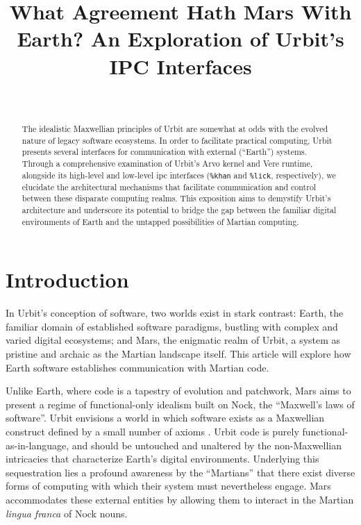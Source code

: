 \documentclass[twoside]{article}
\title{What Agreement Hath Mars With Earth?  An Exploration of Urbit's IPC Interfaces}
\author{~\authorpatp \\ \affiliation}
\date{}
\begin{document}
\maketitle
\thispagestyle{firststyle}

\begin{abstract}
\noindent \sloppy
The idealistic Maxwellian principles of Urbit are somewhat at odds with the evolved nature of legacy software ecosystems.  In order to facilitate practical computing, Urbit presents several interfaces for communication with external (“Earth”) systems.  Through a comprehensive examination of Urbit's Arvo kernel and Vere runtime, alongside its high-level and low-level {\sc ipc} interfaces (\texttt{\%khan} and \texttt{\%lick}, respectively), we elucidate the architectural mechanisms that facilitate communication and control between these disparate computing realms.  This exposition aims to demystify Urbit's architecture and underscore its potential to bridge the gap between the familiar digital environments of Earth and the untapped possibilities of Martian computing.
\end{abstract}

\setcounter{page}{1}

\tableofcontents

\section{Introduction}

In Urbit's conception of software, two worlds exist in stark contrast:  Earth, the familiar domain of established software paradigms, bustling with complex and varied digital ecosystems; 
and Mars, the enigmatic realm of Urbit, a system as pristine and archaic as the Martian landscape itself.  This article will explore how Earth software establishes communication with Martian code.

\sloppy
Unlike Earth, where code is a tapestry of evolution and patchwork, Mars aims to present a regime of functional-only idealism built on Nock, the ``Maxwell's laws of software''.  Urbit envisions a world in which software exists as a Maxwellian construct defined by a small number of axioms \citep{Nock4K}.  Urbit code is purely functional-as-in-language, and should be untouched and unaltered by the non-Maxwellian intricacies that characterize Earth’s digital environments.  Underlying this sequestration lies a profound awareness by the ``Martians'' that there exist diverse forms of computing with which their system must nevertheless engage.  Mars accommodates these external entities by allowing them to interact in the Martian \emph{lingua franca} of Nock nouns.
\end{document}

